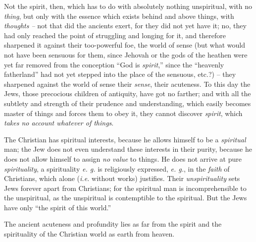 \documentclass[12pt,a4paper]{book}
\begin{document}
Not the spirit, then, which has to do with absolutely nothing unspiritual, 
with no \textit{thing}, but only with the essence which exists behind and 
above things, with \textit{thoughts --} not that did the ancients exert, for 
they did not yet have it; no, they had only reached the point of struggling 
and longing for it, and therefore sharpened it against their too-powerful foe, 
the world of sense (but what would not have been sensuous for them, since 
Jehovah or the gods of the heathen were yet far removed from the conception 
``God is \textit{spirit},'' since the ``heavenly fatherland'' had not yet 
stepped into the place of the sensuous, etc.?) -- they sharpened against the 
world of sense their \textit{sense}, their acuteness. To this day the Jews, 
those precocious children of antiquity, have got no farther; and with all the 
subtlety and strength of their prudence and understanding, which easily 
becomes master of things and forces them to obey it, they cannot discover 
\textit{spirit}, which \textit{takes no account whatever of things}.

The Christian has spiritual interests, because he allows himself to be a 
\textit{spiritual} man; the Jew does not even understand these interests in 
their purity, because he does not allow himself to assign \textit{no value} to 
things. He does not arrive at pure \textit{spirituality}, a spirituality 
\textit{e. g.} is religiously expressed, \textit{e. g.}, in the \textit{faith} 
of Christians, which alone (\textit{i.e.} without works) justifies. Their 
\textit{unspirituality} sets Jews forever apart from Christians; for the 
spiritual man is incomprehensible to the unspiritual, as the unspiritual is 
contemptible to the spiritual. But the Jews have only ``the spirit of this 
world.''

The ancient acuteness and profundity lies as far from the spirit and the 
spirituality of the Christian world as earth from heaven.
\end{document}
